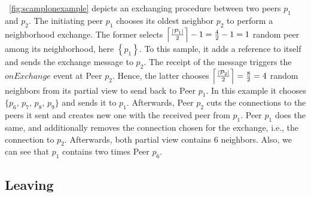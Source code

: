 \begin{asparadesc}
\item [Figure]~\ref{fig:scamplonexample} depicts an exchanging procedure
  between two peers $p_1$ and $p_2$. The initiating peer $p_1$ chooses its
  oldest neighbor $p_2$ to perform a neighborhood exchange. The former selects
  $\left\lceil{|\mathcal{P}_1|\over{2}}\right\rceil-1={4\over{2}}-1=1$ random
  peer among its neighborhood, here $\left\{p_1\right\}$. To this sample, it
  adds a reference to itself and sends the exchange message to $p_2$. The
  receipt of the message triggers the $onExchange$ event at Peer $p_2$. Hence,
  the latter chooses
  $\left\lceil{|\mathcal{P}_2|\over{2}}\right\rceil= {8\over{2}}=4$ random
  neighbors from its partial view to send back to Peer $p_1$. In this example
  it chooses $\{p_6,\,p_7,\,p_8,\,p_9\}$ and sends it to $p_1$. Afterwards,
  Peer $p_2$ cuts the connections to the peers it sent and creates new one with
  the received peer from $p_1$. Peer $p_1$ does the same, and additionally
  removes the connection chosen for the exchange, i.e., the connection to
  $p_2$. Afterwards, both partial view contains $6$ neighbors. Also, we can see
  that $p_1$ contains two times Peer $p_6$.
\end{asparadesc}

\begin{figure*}
  \centering
  
  \caption{\label{fig:scamplonexample} A round of exchange between two peers
    using \SCAMPLON{}. In this case, Peer $p_1$ initiates an exchange with its
    oldest neighbor $p_2$ (for simplicity sake, only the partial view of the
    peers involved in the exchange are explicitly drawn). The network on the
    left shows the network before the exchange, and the network on the right
    shows the network after the exchange. After the exchange of peers chosen at
    random, both peers $p_1$ and $p_2$ have a partial view size of $6$.}
\end{figure*}

\subsection{Leaving}

\begin{algorithm}
  
  \caption{\label{algo:unreachable}The crash handler of \SCAMPLON{}.}
\end{algorithm}

